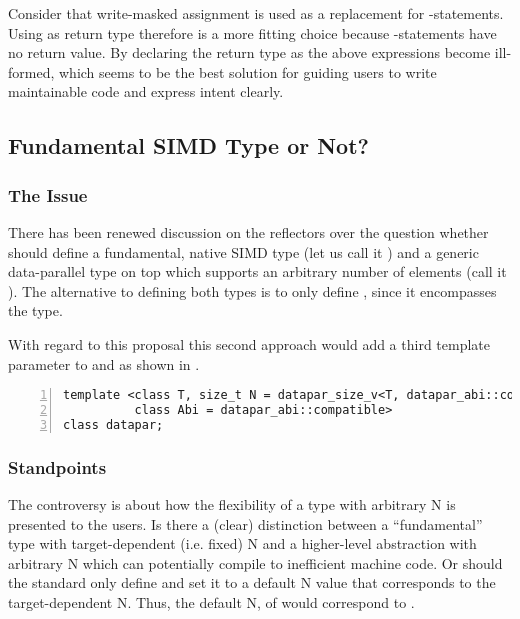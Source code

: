 Consider that write-masked assignment is used as a replacement for -statements.
Using \void as return type therefore is a more fitting choice because -statements have no return value.
By declaring the return type as \void the above expressions become ill-formed, which seems to be the best solution for guiding users to write maintainable code and express intent clearly.

\subsection{Fundamental SIMD Type or Not?}
\subsubsection{The Issue}
There has been renewed discussion on the reflectors over the question whether \CC{} should define a fundamental, native SIMD type (let us call it ) and a generic data-parallel type on top which supports an arbitrary number of elements (call it ).
The alternative to defining both types is to only define , since it encompasses the  type.

With regard to this proposal this second approach would add a third template parameter to \datapar and \mask as shown in .
\begin{lstlisting}[style=Vc,numbers=left,float,label=lst:datapar N,caption={
  Possible declaration of the class template parameters of a \datapar class with arbitrary width.
}]
template <class T, size_t N = datapar_size_v<T, datapar_abi::compatible>,
          class Abi = datapar_abi::compatible>
class datapar;
\end{lstlisting}

\subsubsection{Standpoints}
The controversy is about how the flexibility of a type with arbitrary \code N is presented to the users.
Is there a (clear) distinction between a “fundamental” type with target-dependent (i.e. fixed) \code N and a higher-level abstraction with arbitrary \code N which can potentially compile to inefficient machine code.
Or should the \CC{} standard only define  and set it to a default \code N value that corresponds to the target-dependent \code N.
Thus, the default \code N, of  would correspond to .

